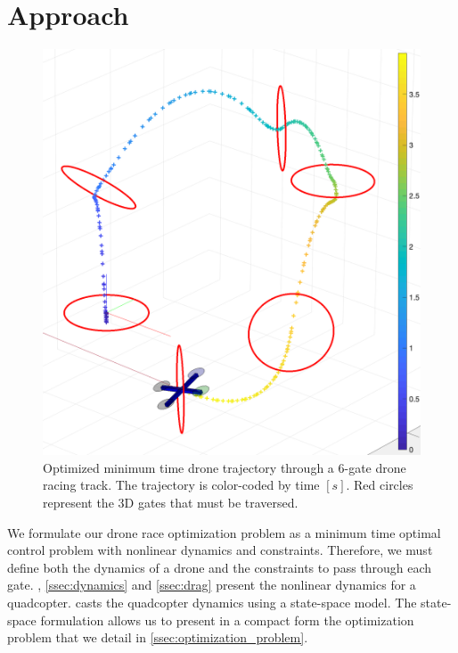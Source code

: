 
\section{Approach}
\label{sec:mathematical_formulation}

\begin{figure}[tbp]
  \centering
  \includegraphics[width=\linewidth]{img/DroneRaceTrajectoryOpt.png}
  \caption{Optimized minimum time drone trajectory through a 6-gate drone racing track. The trajectory is color-coded by time $[s]$. Red circles represent the 3D gates that must be traversed.}
  \label{fig:optimized_trajectory}
\end{figure}

We formulate our drone race optimization problem as a minimum time optimal control problem with nonlinear dynamics and constraints.
Therefore, we must define both the dynamics of a drone and the constraints to pass through each gate.
, \ref{ssec:dynamics} and \ref{ssec:drag} present the nonlinear dynamics for a quadcopter.
 casts the quadcopter dynamics using a state-space model.
The state-space formulation allows us to present in a compact form the optimization problem that we detail in \cref{ssec:optimization_problem}.

